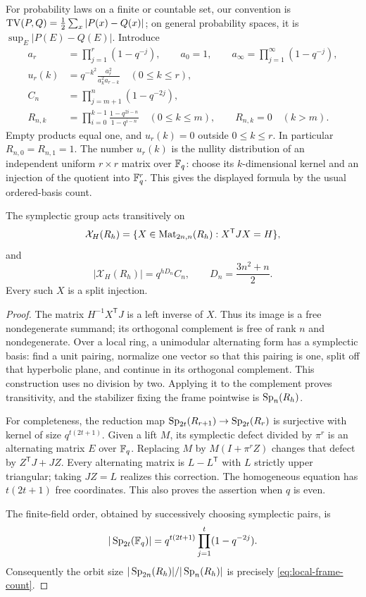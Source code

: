 For probability laws on a finite or countable set, our convention is
\(\operatorname{TV}(P,Q)=\frac12\sum_x|P(x)-Q(x)|\); on general probability spaces,
it is \(\sup_E|P(E)-Q(E)|\).
Introduce
\begin{align}
 a_r&=\prod_{j=1}^r(1-q^{-j}),\qquad a_0=1,\qquad
 a_\infty=\prod_{j=1}^\infty(1-q^{-j}),\nonumber\\
 u_r(k)&=q^{-k^2}\frac{a_r^2}{a_k^2a_{r-k}}
       \quad(0\le k\le r),\nonumber\\
 C_n&=\prod_{j=m+1}^n(1-q^{-2j}),\label{eq:local-constants}\\
 R_{n,k}&=\prod_{i=0}^{k-1}\frac{1-q^{2i-n}}{1-q^{i-n}}
           \quad(0\le k\le m),\qquad
 R_{n,k}=0\quad(k>m).\nonumber
\end{align}
Empty products equal one, and \(u_r(k)=0\) outside \(0\le k\le r\).
In particular \(R_{n,0}=R_{n,1}=1\).
The number \(u_r(k)\) is the nullity distribution of an independent uniform
\(r\times r\) matrix over \(\mathbb F_q\): choose its \(k\)-dimensional kernel
and an injection of the quotient into \(\mathbb F_q^r\).
This gives the displayed formula by the usual ordered-basis count.

\begin{lemma}\label{lem:local-frames}
The symplectic group acts transitively on
\[
 \mathcal X_H(R_h)
 =\{X\in\operatorname{Mat}_{2n,n}(R_h):X^{\mathsf T}JX=H\},
\]
and
\[
 |\mathcal X_H(R_h)|=q^{hD_n}C_n,
 \qquad D_n=\frac{3n^2+n}{2}.
 \tag{L2}\label{eq:local-frame-count}
\]
Every such \(X\) is a split injection.
\end{lemma}

\begin{proof}
The matrix \(H^{-1}X^{\mathsf T}J\) is a left inverse of \(X\).
Thus its image is a free nondegenerate summand; its orthogonal complement
is free of rank \(n\) and nondegenerate. Over a local ring, a unimodular
alternating form has a symplectic basis: find a unit pairing, normalize
one vector so that this pairing is one, split off that hyperbolic plane,
and continue in its orthogonal complement. This construction uses no
division by two. Applying it to the complement proves transitivity, and
the stabilizer fixing the frame pointwise is \(\operatorname{Sp}_n(R_h)\).

For completeness, the reduction map
\(\operatorname{Sp}_{2t}(R_{r+1})\to\operatorname{Sp}_{2t}(R_r)\) is surjective with kernel of size
\(q^{t(2t+1)}\). Given a lift \(M\), its symplectic defect divided by
\(\pi^r\) is an alternating matrix \(E\) over \(\mathbb F_q\).
Replacing \(M\) by \(M(I+\pi^r Z)\) changes that defect by
\(Z^{\mathsf T}J+JZ\).
Every alternating matrix is \(L-L^{\mathsf T}\) with \(L\) strictly
upper triangular; taking \(JZ=L\) realizes this correction.
The homogeneous equation has \(t(2t+1)\) free coordinates.
This also proves the assertion when \(q\) is even.

The finite-field order, obtained by successively choosing symplectic
pairs, is
\[
 |\operatorname{Sp}_{2t}(\mathbb F_q)|
   =q^{t(2t+1)}\prod_{j=1}^t(1-q^{-2j}).
\]
Consequently the orbit size
\(|\operatorname{Sp}_{2n}(R_h)|/|\operatorname{Sp}_n(R_h)|\) is precisely \eqref{eq:local-frame-count}.
\end{proof}

